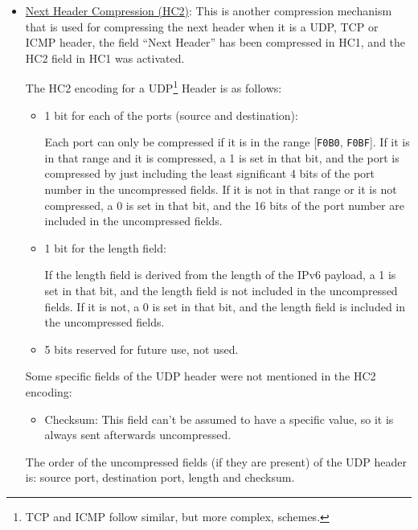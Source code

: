 \begin{itemize}
    It should be noted that, in a worst case, no compression but the opposite would happen. In that case, we can just send the uncompressed IPv6 header, but no HC2 compression would be possible.

    \item \ul{Next Header Compression (HC2)}: This is another compression mechanism that is used for compressing the next header when it is a UDP, TCP or ICMP header, the field ``Next Header'' has been compressed in HC1, and the HC2 field in HC1 was activated.
    
    The HC2 encoding for a UDP\footnote{TCP and ICMP follow similar, but more complex, schemes.} Header is as follows:
    \begin{itemize}
        \item 1 bit for each of the ports (source and destination):
        
        Each port can only be compressed if it is in the range [\texttt{F0B0}, \texttt{F0BF}]. If it is in that range and it is compressed, a 1 is set in that bit, and the port is compressed by just including the least significant 4 bits of the port number in the uncompressed fields. If it is not in that range or it is not compressed, a 0 is set in that bit, and the 16 bits of the port number are included in the uncompressed fields.
        
        \item 1 bit for the length field:
        
        If the length field is derived from the length of the IPv6 payload, a 1 is set in that bit, and the length field is not included in the uncompressed fields. If it is not, a 0 is set in that bit, and the length field is included in the uncompressed fields.
        
        \item 5 bits reserved for future use, not used.
    \end{itemize}

    Some specific fields of the UDP header were not mentioned in the HC2 encoding:
    \begin{itemize}
        \item Checksum: This field can't be assumed to have a specific value, so it is always sent afterwards uncompressed.
    \end{itemize}

    The order of the uncompressed fields (if they are present) of the UDP header is: source port, destination port, length and checksum.
\end{itemize}

